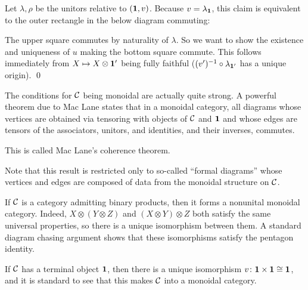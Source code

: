 \eprop

\bproof

    Let $\lambda,\rho$ be the unitors relative to $({\bf1},v)$.
    Because $v=\lambda_{\bf1}$, this claim is equivalent to the outer rectangle in the below diagram commuting:


    The upper square commutes by naturality of $\lambda$.
    So we want to show the existence and uniqueness of $u$ making the bottom square commute.
    This follows immediately from $X\mapsto X\otimes{\bf1}'$ being fully faithful ($(v')^{-1}\circ\lambda_{{\bf1}'}$ has a unique origin).
    \qed

\eproof

\bnote

    The conditions for ${{\cal C}}$ being monoidal are actually quite strong.
    A powerful theorem due to Mac Lane states that in a monoidal category, all diagrams whose vertices are obtained via tensoring with objects of ${{\cal C}}$ and ${\bf1}$
    and whose edges are tensors of the associators, unitors, and identities, and their inverses, commutes.

    This is called {\emphcolor Mac Lane's coherence theorem}.

    Note that this result is restricted only to so-called ``formal diagrams'' whose vertices and edges are composed of data from the monoidal structure on ${{\cal C}}$.

\enote

\bexam

    If ${{\cal C}}$ is a category admitting binary products, then it forms a nonunital monoidal category.
    Indeed, $X\otimes(Y\otimes Z)$ and $(X\otimes Y)\otimes Z$ both satisfy the same universal properties, so there is a unique isomorphism between them.
    A standard diagram chasing argument shows that these isomorphisms satisfy the pentagon identity.

    If ${{\cal C}}$ has a terminal object ${\bf1}$, then there is a unique isomorphism $v\colon{\bf1}\times{\bf1}\cong{\bf1}$, and it is standard to see that this makes ${{\cal C}}$ into a monoidal category.

